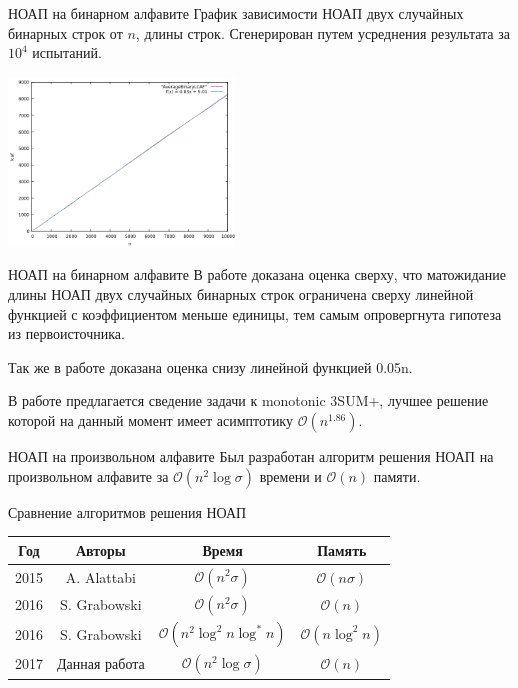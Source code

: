 \documentclass[hyperref=unicode,graphics=pdflatex,12pt]{beamer}
\begin{document}
\begin{frame}{НОАП на бинарном алфавите}
График зависимости НОАП двух случайных бинарных строк от $n$, длины строк. Сгенерирован путем усреднения результата за $10^4$ испытаний.
\begin{center}
\includegraphics[width=6cm]{pics/avlcas.png}
\end{center}
\end{frame}

\begin{frame}{НОАП на бинарном алфавите}
В работе доказана оценка сверху, что матожидание длины НОАП двух случайных бинарных строк
ограничена сверху линейной функцией с коэффициентом меньше единицы, тем самым опровергнута гипотеза из первоисточника.

\vspace{0.5cm}
Так же в работе доказана оценка снизу линейной функцией 0.05n.

\vspace{0.5cm}
В работе предлагается сведение задачи к monotonic 3SUM+, лучшее решение которой на данный момент имеет
асимптотику $\mathcal{O}(n^{1.86})$.
\end{frame}

\begin{frame}{НОАП на произвольном алфавите}
Был разработан алгоритм решения НОАП на произвольном алфавите
за $\mathcal{O}(n^2 \log \sigma)$ времени и $\mathcal{O}(n)$ памяти.

\vspace{0.5cm}

Сравнение алгоритмов решения НОАП

\begin{center}
\begin{tabular}{|c|c|c|c|}
\hline
Год & Авторы & Время & Память \\
\hline
2015 & A. Alattabi & $\mathcal{O}(n^2 \sigma)$ & $\mathcal{O}(n \sigma)$ \\
\hline
2016 & S. Grabowski & $\mathcal{O}(n^2 \sigma)$ & $\mathcal{O}(n)$ \\
\hline
2016 & S. Grabowski & $\mathcal{O}(n^2 \log^2 n \log^* n)$ & $\mathcal{O}(n \log^2 n)$ \\
\hline
2017 & Данная работа & $\mathcal{O}(n^2 \log \sigma)$ & $\mathcal{O}(n)$ \\
\hline
\end{tabular}
\end{center}
\end{frame}
      
\end{document}
